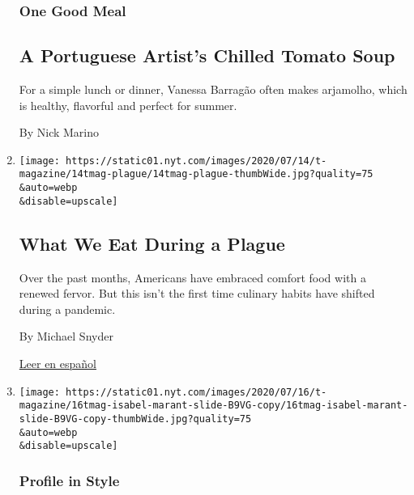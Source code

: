 \begin{enumerate}
  \hypertarget{one-good-meal-1}{%
  \subsubsection{One Good Meal}\label{one-good-meal-1}}

  \hypertarget{a-portuguese-artists-chilled-tomato-soup}{%
  \subsection{A Portuguese Artist's Chilled Tomato
  Soup}\label{a-portuguese-artists-chilled-tomato-soup}}

  For a simple lunch or dinner, Vanessa Barragão often makes arjamolho,
  which is healthy, flavorful and perfect for summer.

  By Nick Marino
\item
  \href{/2020/07/16/t-magazine/eating-food-during-plague.html}{}

  \texttt{[image: https://static01.nyt.com/images/2020/07/14/t-magazine/14tmag-plague/14tmag-plague-thumbWide.jpg?quality=75\\\&auto=webp\\\&disable=upscale]}

  \hypertarget{what-we-eat-during-a-plague}{%
  \subsection{What We Eat During a
  Plague}\label{what-we-eat-during-a-plague}}

  Over the past months, Americans have embraced comfort food with a
  renewed fervor. But this isn't the first time culinary habits have
  shifted during a pandemic.

  By Michael Snyder

  \href{https://www.nytimes.com/es/2020/07/23/t-magazine/comida-pandemia.html}{Leer
  en español}
\item
  \href{/2020/07/16/t-magazine/isabel-marant.html}{}

  \texttt{[image: https://static01.nyt.com/images/2020/07/16/t-magazine/16tmag-isabel-marant-slide-B9VG-copy/16tmag-isabel-marant-slide-B9VG-copy-thumbWide.jpg?quality=75\\\&auto=webp\\\&disable=upscale]}

  \hypertarget{profile-in-style}{%
  \subsubsection{Profile in Style}\label{profile-in-style}}

  \hypertarget{the-designer-who-defined-modern-parisian-cool}{%
}
\end{enumerate}
